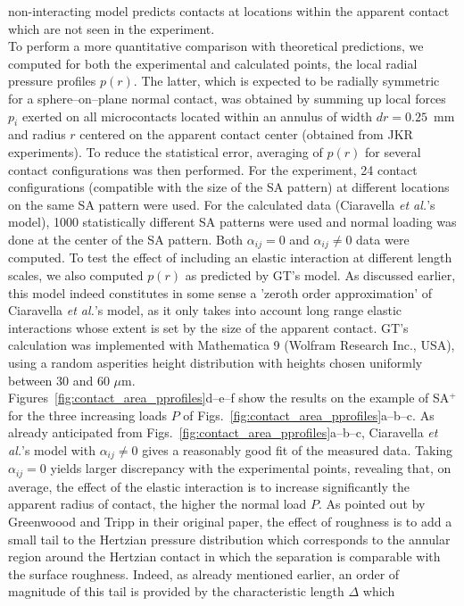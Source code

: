 \documentclass[pre,groupedaddress,showkeys,showpacs,twocolumn]{revtex4}
\begin{document}
non-interacting model predicts contacts at locations within the apparent contact which are not seen in the experiment.\\
\indent To perform a more quantitative comparison with theoretical predictions, we computed for both the experimental and calculated points, the local radial pressure profiles $p(r)$. The latter, which is expected to be radially symmetric for a sphere--on--plane normal contact, was obtained by summing up local forces $p_i$ exerted on all microcontacts located within an annulus of width $dr=0.25$~mm and radius $r$ centered on the apparent contact center (obtained from JKR experiments). To reduce the statistical error, averaging of $p(r)$ for several contact configurations was then performed. For the experiment, 24 contact configurations (compatible with the size of the SA pattern) at different locations on the same SA pattern were used. For the calculated data (Ciaravella \textit{et al.}'s model), 1000 statistically different SA patterns were used and normal loading was done at the center of the SA pattern. Both $\alpha_{ij}=0$ and $\alpha_{ij} \neq 0$ data were computed. To test the effect of including an 
elastic interaction at different length scales, we also computed $p(r)$ as predicted by GT's model. As discussed earlier, this model indeed constitutes in some sense a 'zeroth order approximation' of Ciaravella \textit{et al.}'s model, as it only takes into account long range elastic interactions whose extent is set by the size of the apparent contact. GT's calculation was implemented with Mathematica 9 (Wolfram Research Inc., USA), using a random asperities height distribution with heights chosen uniformly between 30 and 60 $\mu$m.\\
%
\indent Figures~\ref{fig:contact_area_pprofiles}d--e--f show the results on the example of SA$^+$ for the three increasing loads $P$ of Figs.~\ref{fig:contact_area_pprofiles}a--b--c. As already anticipated from Figs.~\ref{fig:contact_area_pprofiles}a--b--c, Ciaravella \textit{et al.}'s model with $\alpha_{ij} \neq 0$ gives a reasonably good fit of the measured data. Taking $\alpha_{ij} = 0$ yields larger discrepancy with the experimental points, revealing that, on average, the effect of the elastic interaction is to increase significantly the apparent radius of contact, the higher the normal load $P$. As pointed out by Greenwoood and Tripp in their original paper, the effect of roughness is to add a small tail to the Hertzian pressure distribution which corresponds to the annular region around the Hertzian contact in which the separation is comparable with the surface roughness. Indeed, as already mentioned earlier, an order of magnitude of this tail is provided by the characteristic length $\Delta$ which 
\end{document}
